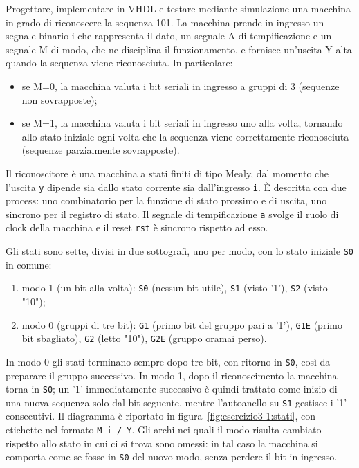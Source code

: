 \label{sec:esercizio3-1}

\begin{traccia}
Progettare, implementare in VHDL e testare mediante simulazione una macchina in grado di riconoscere la sequenza 101. La macchina prende in ingresso un segnale binario i che rappresenta il dato, un segnale A di tempificazione e un segnale M di modo, che ne disciplina il funzionamento, e fornisce un'uscita Y alta quando la sequenza viene riconosciuta. In particolare:
\begin{itemize}
  \item se M=0, la macchina valuta i bit seriali in ingresso a gruppi di 3 (sequenze non sovrapposte);
  \item se M=1, la macchina valuta i bit seriali in ingresso uno alla volta, tornando allo stato iniziale ogni volta che la sequenza viene correttamente riconosciuta (sequenze parzialmente sovrapposte).
\end{itemize}
\end{traccia}

\progetto

Il riconoscitore è una macchina a stati finiti di tipo Mealy, dal momento che l'uscita \texttt{y} dipende sia dallo stato corrente sia dall'ingresso \texttt{i}. È descritta con due process: uno combinatorio per la funzione di stato prossimo e di uscita, uno sincrono per il registro di stato. Il segnale di tempificazione \texttt{a} svolge il ruolo di clock della macchina e il reset \texttt{rst} è sincrono rispetto ad esso.

Gli stati sono sette, divisi in due sottografi, uno per modo, con lo stato iniziale \texttt{S0} in comune:
\begin{enumerate}
  \item modo 1 (un bit alla volta): \texttt{S0} (nessun bit utile), \texttt{S1} (visto '1'), \texttt{S2} (visto "10");
  \item modo 0 (gruppi di tre bit): \texttt{G1} (primo bit del gruppo pari a '1'), \texttt{G1E} (primo bit sbagliato), \texttt{G2} (letto "10"), \texttt{G2E} (gruppo oramai perso).
\end{enumerate}
In modo 0 gli stati terminano sempre dopo tre bit, con ritorno in \texttt{S0}, così da preparare il gruppo successivo. In modo 1, dopo il riconoscimento la macchina torna in \texttt{S0}; un '1' immediatamente successivo è quindi trattato come inizio di una nuova sequenza solo dal bit seguente, mentre l'autoanello su \texttt{S1} gestisce i '1' consecutivi. Il diagramma è riportato in figura~\ref{fig:esercizio3-1:stati}, con etichette nel formato \texttt{M i / Y}. Gli archi nei quali il modo risulta cambiato rispetto allo stato in cui ci si trova sono omessi: in tal caso la macchina si comporta come se fosse in \texttt{S0} del nuovo modo, senza perdere il bit in ingresso.

